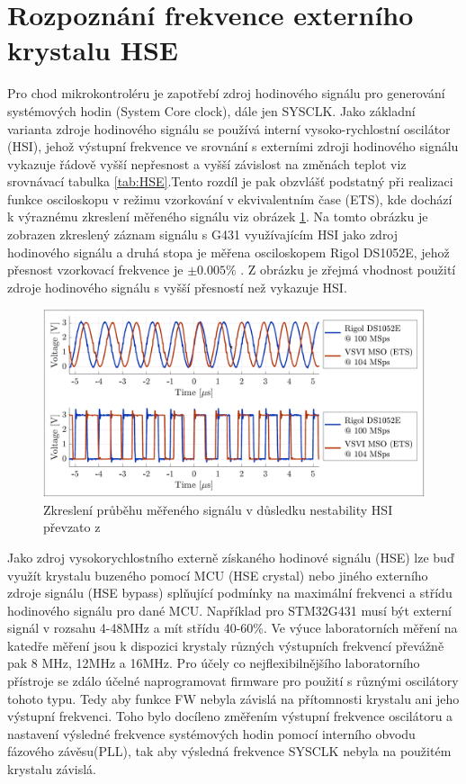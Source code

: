 \section{Rozpoznání frekvence externího krystalu HSE}
Pro chod mikrokontroléru je zapotřebí zdroj hodinového signálu pro generování systémových hodin (System Core clock), dále jen SYSCLK. Jako základní varianta zdroje hodinového signálu se používá interní vysoko-rychlostní oscilátor (HSI), jehož výstupní frekvence ve srovnání s externími zdroji hodinového signálu vykazuje řádově vyšší nepřesnost a vyšší závislost na změnách teplot viz srovnávací tabulka \ref{tab:HSE}.Tento rozdíl je pak obzvlášť podstatný při realizaci funkce osciloskopu v režimu vzorkování v ekvivalentním čase (ETS), kde dochází k výraznému zkreslení měřeného signálu viz obrázek \ref{fig:signaldistortionhsi}. Na tomto obrázku je zobrazen zkreslený záznam signálu s G431 využívajícím HSI jako zdroj hodinového signálu a druhá stopa je měřena osciloskopem Rigol DS1052E, jehož přesnost vzorkovací frekvence je $\pm0.005\%$ \cite{ScopeRigol}. Z obrázku je zřejmá vhodnost použití zdroje hodinového signálu s vyšší přesností než vykazuje HSI.

\begin{figure}[H]
	\centering
	\includegraphics[width=0.7\linewidth]{Figs/Graphs/SignalDistortion_HSI}
	\caption{Zkreslení průběhu měřeného signálu v důsledku nestability HSI převzato z \cite{DujavaDIP}}
	\label{fig:signaldistortionhsi}
\end{figure}

Jako zdroj vysokorychlostního externě získaného hodinové signálu (HSE) lze buď využít krystalu buzeného pomocí MCU (HSE crystal) nebo jiného externího zdroje signálu (HSE bypass) splňující podmínky na maximální frekvenci a střídu hodinového signálu pro dané MCU. Například pro STM32G431 musí být externí signál v rozsahu 4-48MHz a mít střídu 40-60\%. Ve výuce laboratorních měření na katedře měření jsou k dispozici krystaly různých výstupních frekvencí převážně pak 8 MHz, 12MHz a 16MHz. Pro  účely co nejflexibilnějšího laboratorního přístroje se zdálo účelné naprogramovat firmware pro použití s různými  oscilátory tohoto typu. Tedy aby funkce FW nebyla závislá na přítomnosti krystalu ani jeho výstupní frekvenci. Toho bylo docíleno změřením výstupní frekvence oscilátoru a nastavení výsledné frekvence systémových hodin pomocí interního obvodu fázového závěsu(PLL), tak aby výsledná frekvence SYSCLK nebyla na použitém krystalu závislá.


